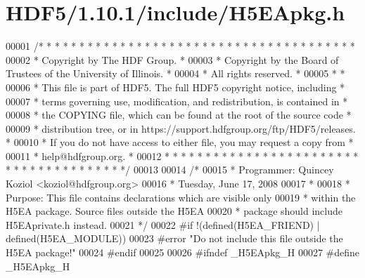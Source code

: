 \hypertarget{_h_d_f5_21_810_81_2include_2_h5_e_apkg_8h_source}{}\section{H\+D\+F5/1.10.1/include/\+H5\+E\+Apkg.h}
\label{_h_d_f5_21_810_81_2include_2_h5_e_apkg_8h_source}

\begin{DoxyCode}
00001 \textcolor{comment}{/* * * * * * * * * * * * * * * * * * * * * * * * * * * * * * * * * * * * * * *}
00002 \textcolor{comment}{ * Copyright by The HDF Group.                                               *}
00003 \textcolor{comment}{ * Copyright by the Board of Trustees of the University of Illinois.         *}
00004 \textcolor{comment}{ * All rights reserved.                                                      *}
00005 \textcolor{comment}{ *                                                                           *}
00006 \textcolor{comment}{ * This file is part of HDF5.  The full HDF5 copyright notice, including     *}
00007 \textcolor{comment}{ * terms governing use, modification, and redistribution, is contained in    *}
00008 \textcolor{comment}{ * the COPYING file, which can be found at the root of the source code       *}
00009 \textcolor{comment}{ * distribution tree, or in https://support.hdfgroup.org/ftp/HDF5/releases.  *}
00010 \textcolor{comment}{ * If you do not have access to either file, you may request a copy from     *}
00011 \textcolor{comment}{ * help@hdfgroup.org.                                                        *}
00012 \textcolor{comment}{ * * * * * * * * * * * * * * * * * * * * * * * * * * * * * * * * * * * * * * */}
00013 
00014 \textcolor{comment}{/*}
00015 \textcolor{comment}{ * Programmer:      Quincey Koziol <koziol@hdfgroup.org>}
00016 \textcolor{comment}{ *                  Tuesday, June 17, 2008}
00017 \textcolor{comment}{ *}
00018 \textcolor{comment}{ * Purpose:         This file contains declarations which are visible only}
00019 \textcolor{comment}{ *                  within the H5EA package.  Source files outside the H5EA}
00020 \textcolor{comment}{ *                  package should include H5EAprivate.h instead.}
00021 \textcolor{comment}{ */}
00022 \textcolor{preprocessor}{#if !(defined(H5EA\_FRIEND) | defined(H5EA\_MODULE))}
00023 \textcolor{preprocessor}{#error "Do not include this file outside the H5EA package!"}
00024 \textcolor{preprocessor}{#endif}
00025 
00026 \textcolor{preprocessor}{#ifndef \_H5EApkg\_H}
00027 \textcolor{preprocessor}{#define \_H5EApkg\_H}

\end{DoxyCode}
